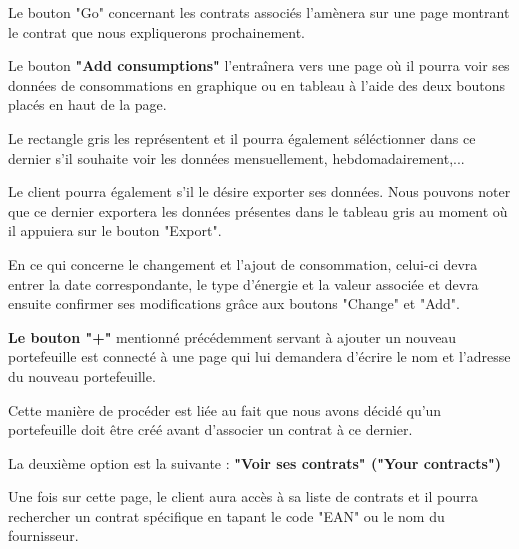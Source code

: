 \begin{flushleft}
Le bouton "Go" concernant les contrats associés l'amènera sur une page montrant le contrat que nous expliquerons prochainement.
\end{flushleft}

\begin{flushleft}
Le bouton \textbf{"Add consumptions"} l'entraînera vers une page où il pourra voir ses données de consommations en graphique ou en tableau à l'aide des deux boutons placés en haut de la page.
\end{flushleft}
\begin{flushleft}
Le rectangle gris les représentent et il pourra également séléctionner dans ce dernier s'il souhaite voir les données mensuellement, hebdomadairement,...
\end{flushleft}
\begin{flushleft}
Le client pourra également s'il le désire exporter ses données.
Nous pouvons noter que ce dernier exportera les données présentes dans le tableau gris au moment où il appuiera sur le bouton "Export".
\end{flushleft}
\begin{flushleft}
En ce qui concerne le changement et l'ajout de consommation, celui-ci devra entrer la date correspondante, le type d'énergie et la valeur associée et devra ensuite confirmer ses modifications grâce aux boutons "Change" et "Add".
\end{flushleft}

\begin{flushleft}
\textbf{Le bouton "+"} mentionné précédemment servant à ajouter un nouveau portefeuille est connecté à une page qui lui demandera d'écrire le nom et l'adresse du nouveau portefeuille.
\end{flushleft}

\begin{flushleft}
Cette manière de procéder est liée au fait que nous avons décidé qu'un portefeuille doit être créé avant d'associer un contrat à ce dernier.
\end{flushleft}

\begin{flushleft}
La deuxième option est la suivante : \textbf{"Voir ses contrats" ("Your contracts")}
\end{flushleft}

\begin{flushleft}
Une fois sur cette page, le client aura accès à sa liste de contrats et il pourra rechercher un contrat spécifique en tapant le code "EAN" ou le nom du fournisseur.
\end{flushleft}


